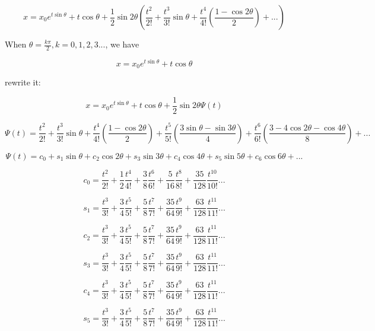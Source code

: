 \documentclass{article}
\begin{document}
\begin{equation}
   x =  x_0 e^{t \sin \theta} + t \cos \theta + \frac{1}{2} \sin 2\theta (\frac{t^2}{2!} + \frac{t^3}{3!} \sin \theta + \frac{t^4}{4!} (\frac{1 - \cos 2\theta}{2}) + ...)
\end{equation}

When $\theta = \frac{k \pi}{2}, k = 0, 1, 2, 3...$, we have

\begin{equation}
    x = x_0 e^{t \sin \theta} + t \cos \theta
\end{equation}

rewrite it:

\begin{equation}
   x =  x_0 e^{t \sin \theta} + t \cos \theta + \frac{1}{2} \sin 2\theta \Psi(t)
\end{equation}

\begin{equation}
   \Psi(t) =  \frac{t^2}{2!} + \frac{t^3}{3!} \sin \theta + \frac{t^4}{4!} (\frac{1 - \cos 2\theta}{2}) + \frac{t^5}{5!} (\frac{3 \sin \theta - \sin 3\theta}{4}) + \frac{t^6}{6!} (\frac{3 - 4 \cos 2\theta - \cos 4\theta}{8}) + ...
\end{equation}

\begin{equation}
   \Psi(t) = c_0 + s_1 \sin \theta + c_2 \cos 2\theta + s_3 \sin 3\theta + c_4 \cos 4\theta + s_5 \sin 5\theta + c_6 \cos 6\theta + ...
\end{equation}

\begin{equation}
   c_0 = \frac{t^2}{2!} + \frac{1}{2}\frac{t^4}{4!} + \frac{3}{8} \frac{t^6}{6!} + \frac{5}{16} \frac{t^8}{8!} + \frac{35}{128} \frac{t^{10}}{10!}  ...
\end{equation}

\begin{equation}
   s_1 = \frac{t^3}{3!} + \frac{3}{4}\frac{t^5}{5!} + \frac{5}{8} \frac{t^7}{7!} + \frac{35}{64} \frac{t^9}{9!} + \frac{63}{128} \frac{t^{11}}{11!}  ...
\end{equation}

\begin{equation}
   c_2 = \frac{t^3}{3!} + \frac{3}{4}\frac{t^5}{5!} + \frac{5}{8} \frac{t^7}{7!} + \frac{35}{64} \frac{t^9}{9!} + \frac{63}{128} \frac{t^{11}}{11!}  ...
\end{equation}

\begin{equation}
   s_3 = \frac{t^3}{3!} + \frac{3}{4}\frac{t^5}{5!} + \frac{5}{8} \frac{t^7}{7!} + \frac{35}{64} \frac{t^9}{9!} + \frac{63}{128} \frac{t^{11}}{11!}  ...
\end{equation}

\begin{equation}
   c_4 = \frac{t^3}{3!} + \frac{3}{4}\frac{t^5}{5!} + \frac{5}{8} \frac{t^7}{7!} + \frac{35}{64} \frac{t^9}{9!} + \frac{63}{128} \frac{t^{11}}{11!}  ...
\end{equation}

\begin{equation}
   s_5 = \frac{t^3}{3!} + \frac{3}{4}\frac{t^5}{5!} + \frac{5}{8} \frac{t^7}{7!} + \frac{35}{64} \frac{t^9}{9!} + \frac{63}{128} \frac{t^{11}}{11!}  ...
\end{equation}
\end{document}
